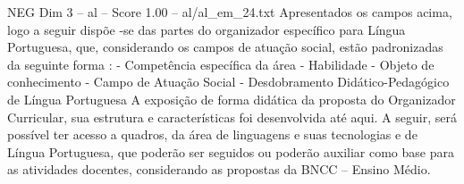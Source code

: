 \begin{textsample}{NEG Dim 3 – al – Score 1.00 – al/al\_em\_24.txt}
Apresentados os campos acima, logo a seguir dispõe -se das partes do organizador específico para Língua Portuguesa, que, considerando os campos de atuação social, estão padronizadas da seguinte forma : - Competência específica da área - Habilidade - Objeto de conhecimento - Campo de Atuação Social - Desdobramento Didático-Pedagógico de Língua Portuguesa A exposição de forma didática da proposta do Organizador Curricular, sua estrutura e características foi desenvolvida até aqui.
A seguir, será possível ter acesso a quadros, da área de linguagens e suas tecnologias e de Língua Portuguesa, que poderão ser seguidos ou poderão auxiliar como base para as atividades docentes, considerando as propostas da BNCC – Ensino Médio.

\end{textsample}
